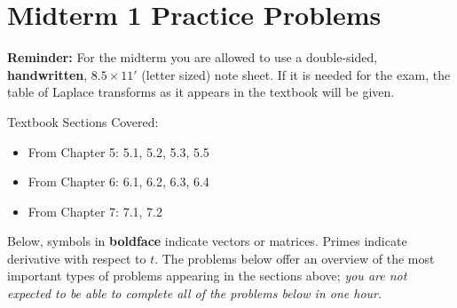\documentclass[11pt]{article}
\title{$1}
\author{Nikolas Eptaminitakis}
\begin{document}
\section*{Midterm 1 Practice Problems}

\noindent\textbf{Reminder:} For the midterm you are allowed to use a double-sided, \textbf{handwritten}, $8.5\times11'$ (letter sized)  note  sheet. If it is needed for the exam, the table of Laplace transforms as it appears in the textbook will be given.

Textbook Sections Covered: 
\begin{itemize}
    \item From Chapter 5: 5.1, 5.2, 5.3, 5.5
    \item From Chapter 6: 6.1, 6.2, 6.3, 6.4
    \item From Chapter 7: 7.1, 7.2 
\end{itemize}



\noindent Below, symbols in \textbf{boldface} indicate vectors or matrices. Primes indicate derivative with respect to $t$. The problems below offer an overview of the most important types of problems appearing in the sections above; \textit{you are not expected to be able to complete all of the problems below in one hour}.
\end{document}
